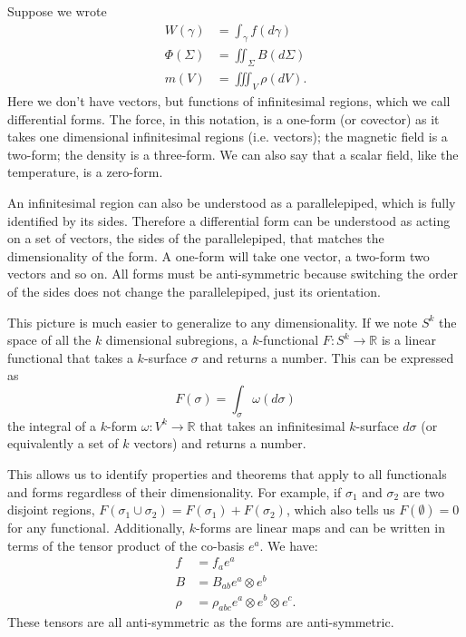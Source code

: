 \documentclass[fleqn,10pt]{wlscirep}
\begin{document}
Suppose we wrote
\begin{equation*}
\begin{aligned}
	W(\gamma) &= \int_\gamma f(d\gamma) \\
	\Phi(\Sigma) &= \iint_\Sigma B(d\Sigma) \\
	m(V) &= \iiint_V \rho(dV).
\end{aligned}
\end{equation*}
Here we don't have vectors, but functions of infinitesimal regions, which we call differential forms. The force, in this notation, is a one-form (or covector) as it takes one dimensional infinitesimal regions (i.e. vectors); the magnetic field is a two-form; the density is a three-form. We can also say that a scalar field, like the temperature, is a zero-form.

An infinitesimal region can also be understood as a parallelepiped, which is fully identified by its sides. Therefore a differential form can be understood as acting on a set of vectors, the sides of the parallelepiped, that matches the dimensionality of the form. A one-form will take one vector, a two-form two vectors and so on. All forms must be anti-symmetric because switching the order of the sides does not change the parallelepiped, just its orientation.

This picture is much easier to generalize to any dimensionality. If we note $S^k$ the space of all the $k$ dimensional subregions, a $k$-functional $F : S^k \to \mathbb{R}$ is a linear functional that takes a $k$-surface $\sigma$ and returns a number. This can be expressed as
\begin{equation*}
	F(\sigma) = \int_\sigma \omega(d\sigma)
\end{equation*}
the integral of a $k$-form $\omega : V^k \to \mathbb{R}$ that takes an infinitesimal $k$-surface $d\sigma$ (or equivalently a set of $k$ vectors) and returns a number.

This allows us to identify properties and theorems that apply to all functionals and forms regardless of their dimensionality. For example, if $\sigma_1$ and $\sigma_2$ are two disjoint regions, $F(\sigma_1 \cup \sigma_2) = F(\sigma_1) + F(\sigma_2)$, which also tells us $F(\emptyset) = 0$ for any functional. Additionally, $k$-forms are linear maps and can be written in terms of the tensor product of the co-basis $e^a$. We have:
\begin{equation*}
	\begin{aligned}
		f &= f_a e^a \\
		B &= B_{ab} e^a \otimes e^b \\
		\rho &= \rho_{abc} e^a \otimes e^b \otimes e^c.
	\end{aligned}
\end{equation*}
These tensors are all anti-symmetric as the forms are anti-symmetric.
\end{document}
